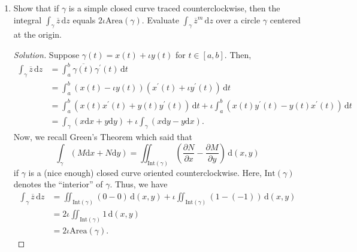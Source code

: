 \documentclass[11pt]{article}
\theoremstyle{definition}
\newenvironment{soln}{\begin{proof}[Solution]}{\end{proof}}
\begin{document}
\begin{enumerate}[leftmargin=*]
\begin{soln}
Note that the contour of integration does not enclose $-1$. Thus, we define $f \colon \mathbb{C} \setminus \{-1\} \to \mathbb{C}$ as
\[
    f(z) = \frac{2z-1}{z+1}.
\]
Note that $f$ is holomorphic on $\mathbb{C} \setminus \{-1\}$. Moreover, $\gamma$ and its interior lie completely within $\mathbb{C} \setminus \{-1\}$. Thus, using the Cauchy integral formula, we have
\[
    2\pi\iota f(1) = \int_{\abs{z-1}=1} \frac{f(z)}{z-1} \, \mathrm{d}z = \int_{\abs{z-1} = 1} \frac{2z-1}{z^2 - 1} \, \mathrm{d}z,
\]
which is precisely the integral we wish to calculate. Thus,
\[
    \int_{\abs{z-1} = 1} \frac{2z-1}{z^2 - 1} \, \mathrm{d}z = 2\pi\iota f(1) = \boxed{\pi\iota}.
\]
\end{soln}

\item Show that if $\gamma$ is a simple closed curve traced counterclockwise, then the integral $\displaystyle\int_{\gamma} \overline{z} \, \mathrm{d}z$ equals $2\iota \text{Area}(\gamma)$. Evaluate $\displaystyle\int_{\gamma} \overline{z}^m \, \mathrm{d}z$ over a circle $\gamma$ centered at the origin.

\begin{soln}
Suppose $\gamma(t) = x(t) + \iota y(t)$ for $t \in [a,b]$. Then,
\begin{align*}
    \int_{\gamma} \overline{z} \, \mathrm{d}z &= \int_a^b \overline{\gamma(t)} \gamma^{\prime}(t) \, \mathrm{d}t \\
    &= \int_a^b (x(t) - \iota y(t)) (x^{\prime}(t) + \iota y^{\prime}(t)) \, \mathrm{d}t \\
    &= \int_a^b (x(t)x^{\prime}(t) + y(t)y^{\prime}(t)) \, \mathrm{d}t + \iota \int_a^b (x(t) y^{\prime}(t) - y(t) x^{\prime}(t)) \, \mathrm{d}t \\
    &= \int_{\gamma} (x \mathrm{d}x + y\mathrm{d}y) + \iota \int_{\gamma} (x \mathrm{d}y - y\mathrm{d}x).
\end{align*}
Now, we recall Green's Theorem which said that
\[
    \int_{\gamma} (M \mathrm{d}x + N \mathrm{d}y) = \iint_{\text{Int}(\gamma)} \left( \frac{\partial N}{\partial x} - \frac{\partial M}{\partial y} \right) \, \mathrm{d}(x,y)
\]
if $\gamma$ is a (nice enough) closed curve oriented counterclockwise. Here, $\text{Int}(\gamma)$ denotes the ``interior'' of $\gamma$. Thus, we have
\begin{align*}
    \int_{\gamma} \overline{z} \, \mathrm{d}z &= \iint_{\text{Int}(\gamma)} (0 - 0) \, \mathrm{d}(x,y) + \iota \iint_{\text{Int}(\gamma)} (1 - (-1)) \, \mathrm{d}(x,y) \\
    &= 2\iota \iint_{\text{Int}(\gamma)} 1 \, \mathrm{d}(x,y) \\
    &= 2\iota \text{Area}(\gamma).
\end{align*}


\end{soln}
\end{enumerate}
\end{document}
